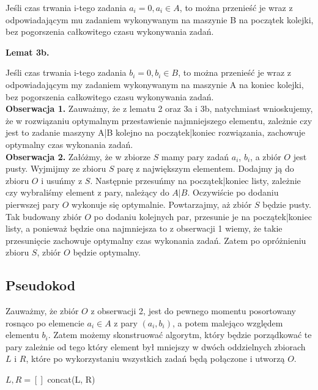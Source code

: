 \documentclass[11pt, wide]{article}
\begin{document}
    Jeśli czas trwania i-tego zadania $a_i = 0, a_i \in A$, to można przenieść je wraz z 
    odpowiadającym mu zadaniem wykonywanym na maszynie B na początek kolejki, bez pogorszenia całkowitego czasu wykonywania zadań.
    
    
    \textbf{Lemat 3b.}

    Jeśli czas trwania i-tego zadania $b_i = 0, b_i \in B$, to można przenieść je wraz z 
    odpowiadającym my zadaniem wykonywanym na maszynie A na koniec kolejki, bez pogorszenia całkowitego czasu wykonywania zadań.
    \\

    \textbf{Obserwacja 1.}
    Zauważmy, że z lematu 2 oraz 3a i 3b, natychmiast wnioskujemy, że w rozwiązaniu optymalnym przestawienie 
    najmniejszego elementu, zależnie czy jest to zadanie maszyny A|B kolejno na początek|koniec rozwiązania, zachowuje
    optymalny czas wykonania zadań.
    \\

    \textbf{Obserwacja 2.}
    Załóżmy, że w zbiorze $S$ mamy pary zadań $a_i$, $b_i$, a zbiór $O$ jest pusty. Wyjmijmy ze zbioru $S$ parę z największym elementem.
    Dodajmy ją do zbioru $O$ i usuńmy z $S$. Następnie przesuńmy na początek|koniec listy, zależnie czy wybraliśmy element z pary, należący do $A|B$.
    Oczywiście po dodaniu pierwszej pary $O$ wykonuje się optymalnie. Powtarzajmy, aż zbiór $S$ będzie pusty. 
    Tak budowany zbiór $O$ po dodaniu kolejnych par, przesunie je na początek|koniec listy,
    a ponieważ będzie ona najmniejsza to z obserwacji 1 wiemy, że takie przesunięcie zachowuje optymalny czas wykonania zadań. 
    Zatem po opróżnieniu zbioru $S$, zbiór $O$ będzie optymalny.

    \subsection{Pseudokod}

    Zauważmy, że zbiór $O$ z obserwacji 2, jest do pewnego momentu posortowany
    rosnąco po elemencie $a_i \in A$ z pary $(a_i, b_i)$, a potem malejąco względem
    elementu $b_i$. Zatem możemy skonstruować algorytm, który będzie porządkować te 
    pary zależnie od tego który element był mniejszy w dwóch oddzielnych zbiorach $L$ i $R$,
    które po wykorzystaniu wszystkich zadań będą połączone i utworzą $O$.


    \begin{algorithm}[H]
     $L,R = []$\;
     \Return concat(L, R)
    \end{algorithm}
    
\end{document}
